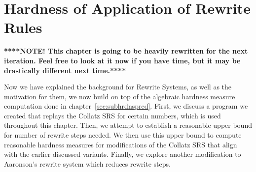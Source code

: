 
\chapter{Hardness of Application of Rewrite Rules} \label{sec:hardnessrewriterules}
\textbf{****NOTE! This chapter is going to be heavily rewritten for the next iteration. Feel free to look at it now if you have time, but it may be drastically different next time.****}\par



Now we have explained the background for Rewrite Systems, as well as the motivation for them, we now build on top of the  algebraic hardness measure computation done in chapter~\ref{sec:subhrdnspred}. First, we discuss a program we created that replays the Collatz SRS for certain numbers, which is used throughout this chapter. Then, we attempt to establish a reasonable upper bound for number of rewrite steps needed. We then use this upper bound to compute reasonable hardness measures for modifications of the Collatz SRS that align with the earlier discussed variants. Finally, we explore another modification to Aaronson's rewrite system which reduces rewrite steps.%
